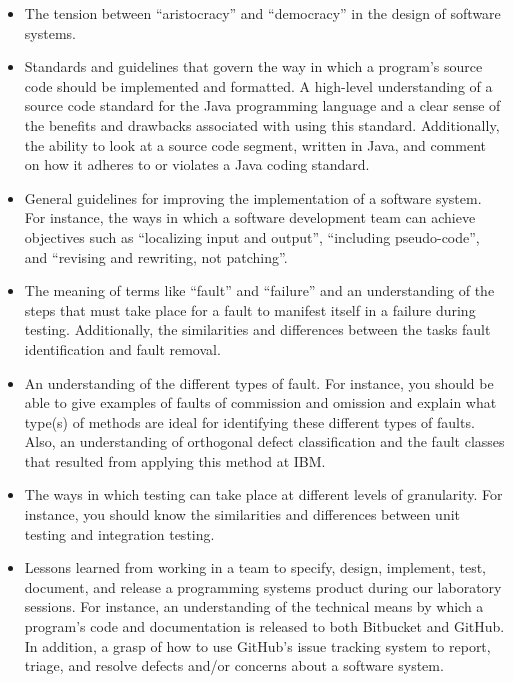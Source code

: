 \begin{itemize}
  \item The tension between ``aristocracy'' and ``democracy'' in the design of software systems.

  \item Standards and guidelines that govern the way in which a program's source code should be implemented and
    formatted. A high-level understanding of a source code standard for the Java programming language and a clear sense
    of the benefits and drawbacks associated with using this standard. Additionally, the ability to look at a source
    code segment, written in Java, and comment on how it adheres to or violates a Java coding standard.

  \item General guidelines for improving the implementation of a software system. For instance, the ways in which a
    software development team can achieve objectives such as ``localizing input and output'', ``including pseudo-code'',
    and ``revising and rewriting, not patching''.

  \item The meaning of terms like ``fault'' and ``failure'' and an understanding of the steps that must take place for a
    fault to manifest itself in a failure during testing. Additionally, the similarities and differences between the
    tasks fault identification and fault removal.

  \item An understanding of the different types of fault. For instance, you should be able to give examples of faults of
    commission and omission and explain what type(s) of methods are ideal for identifying these different types of
    faults. Also, an understanding of orthogonal defect classification and the fault classes that resulted from applying
    this method at IBM.

  \item The ways in which testing can take place at different levels of granularity. For instance, you should know the
    similarities and differences between unit testing and integration testing.

  \item Lessons learned from working in a team to specify, design, implement, test, document, and release a programming
    systems product during our laboratory sessions. For instance, an understanding of the technical means by which a
    program's code and documentation is released to both Bitbucket and GitHub. In addition, a grasp of how to use
    GitHub's issue tracking system to report, triage, and resolve defects and/or concerns about a software system.

\end{itemize}

